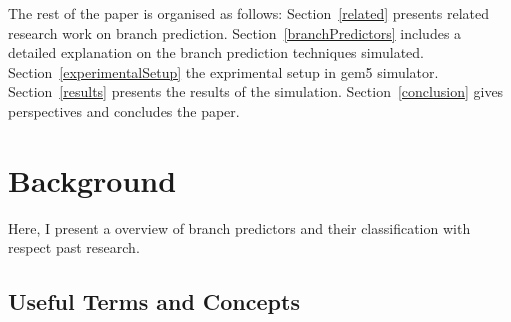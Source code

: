 \documentclass[10pt,journal,compsoc]{IEEEtran}
\begin{document}
The rest of the paper is organised as follows: Section~\ref{related} presents related research work on branch prediction. Section~\ref{branchPredictors} includes a detailed explanation on the branch prediction techniques simulated. 
Section~\ref{experimentalSetup} the exprimental setup in gem5 simulator. Section~\ref{results} presents the results of the simulation. Section~\ref{conclusion} gives perspectives and concludes the paper. 

\section{Background}\label{background}
Here, I present a overview of branch predictors and their classification with respect past research.
\subsection{Useful Terms and Concepts}
\end{document}

